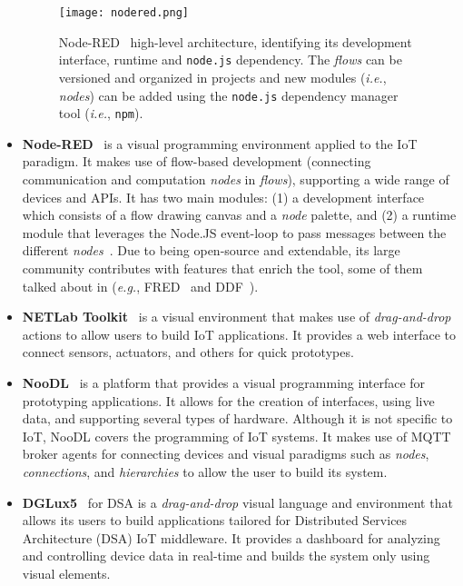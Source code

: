 \begin{itemize}

\begin{figure}[h]
\centering
\texttt{[image: nodered.png]}
\caption[Node-RED high-level architecture.]{Node-RED~\cite{node_red} high-level architecture, identifying its development interface, runtime and \texttt{node.js} dependency. The \textit{flows} can be versioned and organized in projects and new modules (\emph{i.e.}, \textit{nodes}) can be added using the \texttt{node.js} dependency manager tool (\emph{i.e.}, \texttt{npm}).}
\label{fig:nodered-seq}
\end{figure}

\item\textbf{Node-RED}~\cite{node_red} is a visual programming environment applied to the IoT paradigm. It makes use of flow-based development (connecting communication and computation \textit{nodes} in \textit{flows}), supporting a wide range of devices and APIs. It has two main modules: (1) a development interface which consists of a flow drawing canvas and a \textit{node} palette, and (2) a runtime module that leverages the Node.JS event-loop to pass messages between the different \textit{nodes}~. Due to being open-source and extendable, its large community contributes with features that enrich the tool, some of them talked about in  (\emph{e.g.}, FRED~\cite{fred} and DDF~\cite{ddf}).

\item\textbf{NETLab Toolkit}~\cite{netlabtoolkit} is a visual environment that makes use of \textit{drag-and-drop} actions to allow users to build IoT applications. It provides a web interface to connect sensors, actuators, and others for quick prototypes.

\item\textbf{NooDL}~\cite{noodl} is a platform that provides a visual programming interface for prototyping applications. It allows for the creation of interfaces, using live data, and supporting several types of hardware. Although it is not specific to IoT, NooDL covers the programming of IoT systems. It makes use of MQTT broker agents for connecting devices and visual paradigms such as \textit{nodes}, \textit{connections}, and \textit{hierarchies} to allow the user to build its system.

\item\textbf{DGLux5}~\cite{dglux5} for DSA is a \textit{drag-and-drop} visual language and environment that allows its users to build applications tailored for Distributed Services Architecture (DSA) IoT middleware. It provides a dashboard for analyzing and controlling device data in real-time and builds the system only using visual elements.


\end{itemize}
